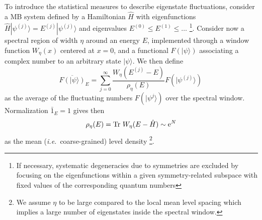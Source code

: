 \documentclass[prl,a4paper,twocolumn,superscriptaddress,floatfix]{revtex4-1}%
\begin{document}
To introduce the statistical measures to describe eigenstate fluctuations,
consider a  MB system defined by a Hamiltonian $\hat{H}$ with  eigenfunctions $\hat{H}|\psi^{(j)}\rangle=E^{(j)}|\psi^{(j)}\rangle$ and eigenvalues $E^{(0)}\le E^{(1)} \le \ldots$ \footnote{
If necessary, systematic degeneracies due to symmetries are excluded by focusing on the  eigenfunctions within a given symmetry-related subspace with fixed values of the corresponding quantum numbers}. Consider now a spectral region of width $\eta$ around an energy $E$, implemented through a window function $W_{\eta}(x)$ centered at $x=0$, and a functional $F(|\psi\rangle)$ associating a complex number to an arbitrary state $|\psi\rangle$. We then define
\begin{equation}
\label{eq:Fexact}
\overline{F(|\psi\rangle)}_{E}=\sum_{j=0}^{\infty}\frac{W_{\eta}(E^{(j)}\!-\!E)}{\rho_{\eta}(E)} F(|\psi^{(j)}\rangle)\, 
\end{equation}
as the average of the fluctuating numbers $F(|\psi^{j}\rangle)$ over the spectral window. Normalization $\bar{1}_{E}=1$ gives then
\begin{equation}
 \rho_{\eta}(E)={\rm Tr~}W_{\eta}(E-\hat{H}) \sim {\rm e}^{N}
\end{equation}
 as the mean ({\em i.e.}~coarse-grained) level density \footnote{We assume $\eta$ to be large compared to the local mean level spacing which implies a large number of eigenstates inside the spectral window.}. 
\end{document}
